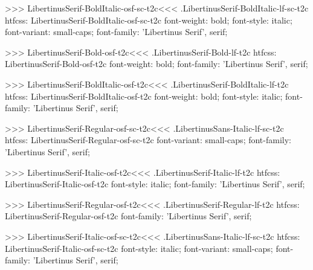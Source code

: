 {{{{{{{{{{{{{{{{>>>
\<LibertinusSerif-BoldItalic-osf-sc-t2c\><<<
.LibertinusSerif-BoldItalic-lf-sc-t2c
htfcss:  LibertinusSerif-BoldItalic-osf-sc-t2c  font-weight: bold; font-style: italic; font-variant: small-caps; font-family: 'Libertinus Serif', serif;

>>>
\<LibertinusSerif-Bold-osf-t2c\><<<
.LibertinusSerif-Bold-lf-t2c
htfcss:  LibertinusSerif-Bold-osf-t2c  font-weight: bold; font-family: 'Libertinus Serif', serif;

>>>
\<LibertinusSerif-BoldItalic-osf-t2c\><<<
.LibertinusSerif-BoldItalic-lf-t2c
htfcss:  LibertinusSerif-BoldItalic-osf-t2c  font-weight: bold; font-style: italic; font-family: 'Libertinus Serif', serif;

>>>
\<LibertinusSerif-Regular-osf-sc-t2c\><<<
.LibertinusSans-Italic-lf-sc-t2c
htfcss:  LibertinusSerif-Regular-osf-sc-t2c  font-variant: small-caps; font-family: 'Libertinus Serif', serif;

>>>
\<LibertinusSerif-Italic-osf-t2c\><<<
.LibertinusSerif-Italic-lf-t2c
htfcss:  LibertinusSerif-Italic-osf-t2c  font-style: italic; font-family: 'Libertinus Serif', serif;

>>>
\<LibertinusSerif-Regular-osf-t2c\><<<
.LibertinusSerif-Regular-lf-t2c
htfcss:  LibertinusSerif-Regular-osf-t2c  font-family: 'Libertinus Serif', serif;

>>>
\<LibertinusSerif-Italic-osf-sc-t2c\><<<
.LibertinusSans-Italic-lf-sc-t2c
htfcss:  LibertinusSerif-Italic-osf-sc-t2c  font-style: italic; font-variant: small-caps; font-family: 'Libertinus Serif', serif;

}}}}}}}}}}}}}}}}
